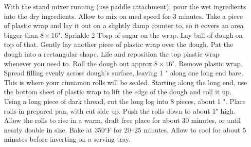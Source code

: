 \begin{minipage}{\linewidth}
{With the stand mixer running (use paddle attachment), pour the wet ingredients into the dry ingredients. Allow to mix on med speed for 3 minutes. Take a piece of plastic wrap and lay it out on a slightly damp counter to, so it covers an area bigger than $8 \times 16$". Sprinkle 2 Tbsp of sugar on the wrap. Lay ball of dough on top of that. Gently lay another piece of plastic wrap over the dough. Pat the dough into a rectangular shape. Life and reposition the top plastic wrap whenever you need to. Roll the dough out approx $8 \times 16$". 
Remove plastic wrap. Spread filling evenly across dough's surface, leaving 1 " along one long end bare. This is where your cinnamon rolls will be sealed.
Starting along the long end, use the bottom sheet of plastic wrap to lift the edge of the dough and roll it up. Using a long piece of dark thread, cut the long log into 8 pieces, about 1 ". Place rolls in prepared pan, with cut side up. Push the rolls down to about 1" high.
Allow the rolls to rise in a warm, draft free place for about 30 minutes, or until nearly double in size. Bake at 350${}^\circ$F for 20--25 minutes. Allow to cool for about 5 minutes before inverting on a serving tray.}
\end{minipage}

